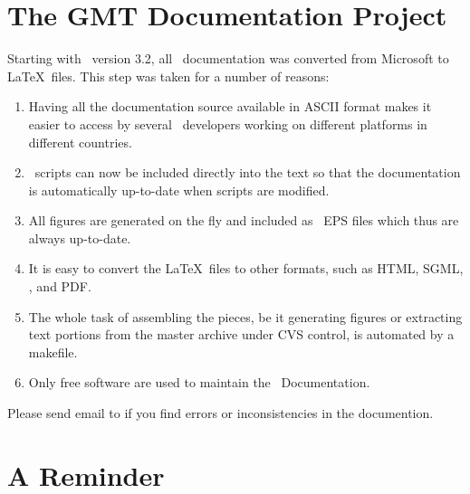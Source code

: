 
\chapter*{The GMT Documentation Project}

Starting with \GMT\ version 3.2, all \GMT\ documentation was
converted from Microsoft  to \LaTeX\ files.
This step was taken for a number of reasons:

\begin{enumerate}

\item Having all the documentation source available in
ASCII format makes it easier to access by several
\GMT\ developers working on different platforms in 
different countries.

\item \GMT\ scripts can now be included directly into the text
so that the documentation is automatically up-to-date
when scripts are modified.

\item All figures are generated on the fly and included as
\GMT\ EPS files which thus are always up-to-date.

\item It is easy to convert the \LaTeX\ files to other
formats, such as HTML, SGML, \PS, and PDF.

\item The whole task of assembling the pieces, be it generating
figures or extracting text portions from the master archive under
CVS control, is automated by a makefile.

\item Only free software are used to maintain the \GMT\ Documentation.

\end{enumerate}

Please send email to
if you find errors or inconsistencies in the documention.

\chapter*{A Reminder}

